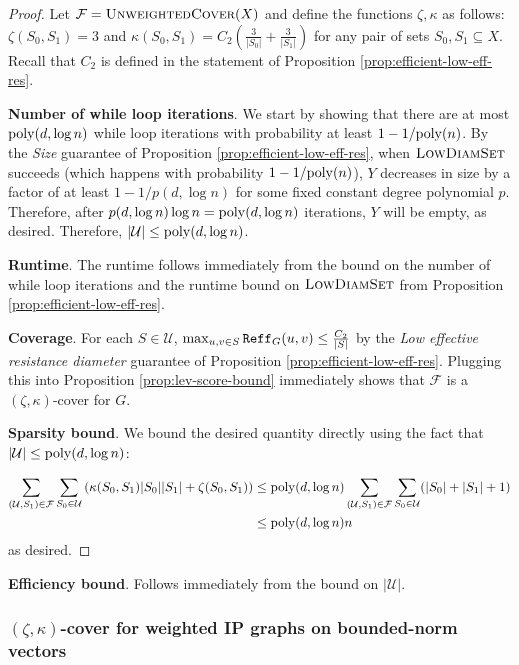 \begin{proof}
Let $\mathcal F = \textsc{UnweightedCover}(X)$ and define the functions $\zeta,\kappa$ as follows: $\zeta(S_0,S_1) = 3$ and $\kappa(S_0,S_1) = C_2\left(\frac{3}{|S_0|} + \frac{3}{|S_1|}\right)$ for any pair of sets $S_0,S_1\subseteq X$. Recall that $C_2$ is defined in the statement of Proposition \ref{prop:efficient-low-eff-res}.

\textbf{Number of while loop iterations}. We start by showing that there are at most $\mathrm{poly}(d,\log n)$ while loop iterations with probability at least $1 - 1/\mathrm{poly}(n)$. By the \emph{Size} guarantee of Proposition \ref{prop:efficient-low-eff-res}, when $\textsc{LowDiamSet}$ succeeds (which happens with probability $1 - 1/\mathrm{poly}(n)$), $Y$ decreases in size by a factor of at least $1 - 1/p(d,\log n)$ for some fixed constant degree polynomial $p$. Therefore, after $p(d,\log n) \log n = \mathrm{poly}(d,\log n)$ iterations, $Y$ will be empty, as desired. Therefore, $|\mathcal U|\le \mathrm{poly}(d,\log n)$.

\textbf{Runtime}. The runtime follows immediately from the bound on the number of while loop iterations and the runtime bound on $\textsc{LowDiamSet}$ from Proposition \ref{prop:efficient-low-eff-res}.

\textbf{Coverage}. For each $S\in \mathcal U$, $\max_{u,v\in S} \mathtt{Reff}_G(u,v)\le \frac{C_2}{|S|}$ by the \emph{Low effective resistance diameter} guarantee of Proposition \ref{prop:efficient-low-eff-res}. Plugging this into Proposition \ref{prop:lev-score-bound} immediately shows that $\mathcal F$ is a $(\zeta,\kappa)$-cover for $G$.

\textbf{Sparsity bound}. We bound the desired quantity directly using the fact that $|\mathcal U|\le \mathrm{poly}(d,\log n)$:

\begin{align*}
    \sum_{(\mathcal U,S_1)\in \mathcal F} \sum_{S_0\in \mathcal U} \left(\kappa(S_0,S_1)|S_0||S_1| + \zeta(S_0,S_1)\right) &\le \mathrm{poly}(d,\log n)\sum_{(\mathcal U,S_1)\in \mathcal F} \sum_{S_0\in \mathcal U} (|S_0| + |S_1| + 1)\\
    &\le \mathrm{poly}(d,\log n) n\\
\end{align*}
as desired.
\end{proof}

\textbf{Efficiency bound}. Follows immediately from the bound on $|\mathcal U|$.

\subsubsection{\texorpdfstring{$(\zeta,\kappa)$}{}-cover for weighted IP graphs on bounded-norm vectors}

